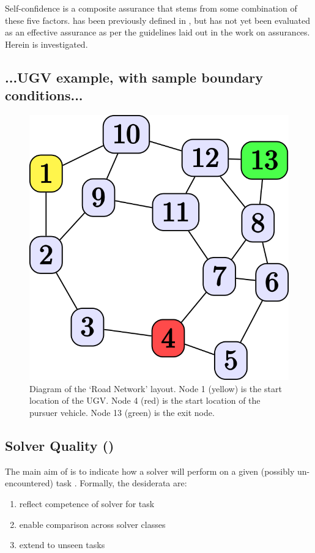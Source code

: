     Self-confidence \xSC{} is a composite assurance that stems from some combination of these five factors. \xP{} has been previously defined in \cite{Aitken2016-cv}, but has not yet been evaluated as an effective assurance as per the guidelines laid out in the work on assurances. Herein \xQ{} is investigated.

\subsection{...UGV example, with sample boundary conditions...}

\begin{figure}[tbp]
    \centering
    \includegraphics[width=0.4\linewidth]{Figures/original_roadnet.png}
    \caption{Diagram of the `Road Network' layout. Node 1 (yellow) is the start location of the UGV. Node 4 (red) is the start location of the pursuer vehicle. Node 13 (green) is the exit node.}
    \label{fig:roadnet}
\end{figure}

\subsection{Solver Quality (\xQ)} \label{sec:SQ}
    The main aim of \xQ{} is to indicate how a solver \solve{} will perform on a given (possibly un-encountered) task \task{}. Formally, the desiderata are:

    \begin{enumerate}[label=\textbf{D\arabic*}]
        \item reflect competence of solver \solve{} for task \task{} \label{itm:d1}
        \item enable comparison across solver classes \label{itm:d2}
        \item extend to unseen tasks \label{itm:d3}
    \end{enumerate}
    
